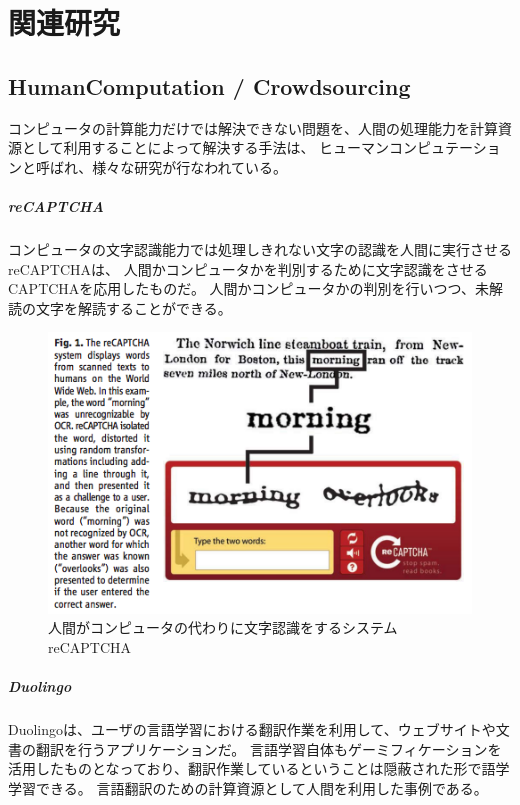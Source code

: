 \chapter{関連研究}\label{chap:related}

\section{HumanComputation /
Crowdsourcing}\label{humancomputation-crowdsourcing}

コンピュータの計算能力だけでは解決できない問題を、人間の処理能力を計算資源として利用することによって解決する手法は、
ヒューマンコンピュテーション\cite{humancomputation}と呼ばれ、様々な研究が行なわれている。

\paragraph{reCAPTCHA}\label{recaptcha}

\mbox{}

コンピュータの文字認識能力では処理しきれない文字の認識を人間に実行させるreCAPTCHA\cite{recaptcha}は、
人間かコンピュータかを判別するために文字認識をさせるCAPTCHA\cite{captcha}を応用したものだ。
人間かコンピュータかの判別を行いつつ、未解読の文字を解読することができる。

\begin{figure}[htbp]
  \begin{center}
  \includegraphics[width=.5\linewidth,bb=0 0 476 316]{images/recaptcha.png}
  \end{center}
  \caption{人間がコンピュータの代わりに文字認識をするシステム reCAPTCHA}
  \label{fig:recaptcha}
\end{figure}

\paragraph{Duolingo}\label{duolingo}

\mbox{}

Duolingo\cite{duolingo}は、ユーザの言語学習における翻訳作業を利用して、ウェブサイトや文書の翻訳を行うアプリケーションだ。
言語学習自体もゲーミフィケーションを活用したものとなっており、翻訳作業しているということは隠蔽された形で語学学習できる。
言語翻訳のための計算資源として人間を利用した事例である。

